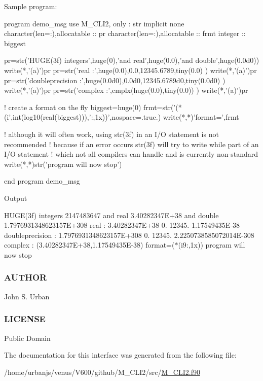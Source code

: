 Sample program\+: \begin{DoxyVerb}  program demo_msg
  use M_CLI2, only : str
  implicit none
  character(len=:),allocatable :: pr
  character(len=:),allocatable :: frmt
  integer                      :: biggest

  pr=str('HUGE(3f) integers',huge(0),'and real',huge(0.0),'and double',huge(0.0d0))
  write(*,'(a)')pr
  pr=str('real            :',huge(0.0),0.0,12345.6789,tiny(0.0) )
  write(*,'(a)')pr
  pr=str('doubleprecision :',huge(0.0d0),0.0d0,12345.6789d0,tiny(0.0d0) )
  write(*,'(a)')pr
  pr=str('complex         :',cmplx(huge(0.0),tiny(0.0)) )
  write(*,'(a)')pr

  ! create a format on the fly
  biggest=huge(0)
  frmt=str('(*(i',int(log10(real(biggest))),':,1x))',nospace=.true.)
  write(*,*)'format=',frmt

  ! although it will often work, using str(3f) in an I/O statement is not recommended
  ! because if an error occurs str(3f) will try to write while part of an I/O statement
  ! which not all compilers can handle and is currently non-standard
  write(*,*)str('program will now stop')

  end program demo_msg
\end{DoxyVerb}


Output

H\+U\+G\+E(3f) integers 2147483647 and real 3.\+40282347E+38 and double 1.\+7976931348623157E+308 real \+: 3.\+40282347E+38 0. 12345. 1.\+17549435E-\/38 doubleprecision \+: 1.\+7976931348623157E+308 0. 12345. 2.\+2250738585072014E-\/308 complex \+: (3.\+40282347E+38,1.\+17549435E-\/38) format=($\ast$(i9\+:,1x)) program will now stop

\subsubsection*{A\+U\+T\+H\+OR}

John S. Urban \subsubsection*{L\+I\+C\+E\+N\+SE}

Public Domain 

The documentation for this interface was generated from the following file\+:\begin{DoxyCompactItemize}
\item 
/home/urbanjs/venus/\+V600/github/\+M\+\_\+\+C\+L\+I2/src/\mbox{\hyperlink{M__CLI2_8f90}{M\+\_\+\+C\+L\+I2.\+f90}}\end{DoxyCompactItemize}
